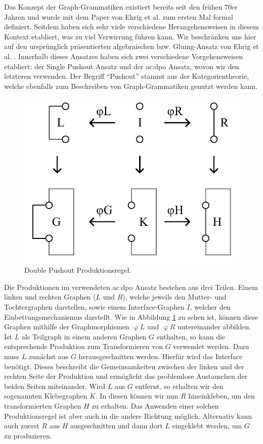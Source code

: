 Das Konzept der Graph-Grammatiken existiert bereits seit den frühen 70er Jahren und wurde mit dem Paper von Ehrig et al. \cite{7_ehrig_et_al}
zum ersten Mal formal definiert. Seitdem haben sich sehr viele verschiedene Herangehensweisen in diesem Kontext etabliert, was zu viel Verwirrung
führen kann. \cite{30_könig_et_al} Wir beschränken uns hier auf den ursprünglich präsentierten algebraischen bzw. Gluing-Ansatz von Ehrig 
et al. \cite{7_ehrig_et_al}. Innerhalb dieses Ansatzes haben sich zwei verschiedene Vorgehensweisen etabliert: der Single Pushout Ansatz und der
\gls{ac:dpo} Ansatz, wovon wir den letzteren verwenden. Der Begriff ``Pushout'' stammt aus der Kategorientheorie, welche ebenfalls zum Beschreiben
von Graph-Grammatiken genutzt werden kann. \cite{1_merrell}

\begin{figure}[t]
    \centering
    \includegraphics[width=\imgWidth/2]{images/dpo_rule.pdf}
    \caption{Double Pushout Produktionsregel.}
    \label{fig:dpo_rule}
\end{figure}

Die Produktionen im verwendeten \gls{ac:dpo} Ansatz bestehen aus drei Teilen. Einem linken und rechten Graphen (\(L\) und \(R\)), welche jeweils
den Mutter- und Tochtergraphen darstellen, sowie einem Interface-Graphen \(I\), welcher den Einbettungsmechanismus darstellt. Wie in Abbildung
\ref{fig:dpo_rule} zu sehen ist, können diese Graphen mithilfe der Graphmorphismen \(\upvarphi L\) und \(\upvarphi R\) untereinander abbilden.
Ist \(L\) als Teilgraph in einem anderen Graphen \(G\) enthalten, so kann die entsprechende Produktion zum Transformieren von \(G\) verwendet werden.
Dazu muss \(L\) zunächst aus \(G\) herausgeschnitten werden. Hierfür wird das Interface benötigt. Dieses beschreibt die Gemeinsamkeiten zwischen
der linken und der rechten Seite der Produktion und ermöglicht das problemlose Austauschen der beiden Seiten miteinander. Wird \(L\) aus \(G\)
entfernt, so erhalten wir den sogenannten Klebegraphen \(K\). In diesen können wir nun \(R\) hineinkleben, um den transformierten Graphen \(H\)
zu erhalten. Das Anwenden einer solchen Produktionsregel ist aber auch in die andere Richtung möglich. Alternativ kann auch zuerst \(R\) aus
\(H\) ausgeschnitten und dann dort \(L\) eingeklebt werden, um \(G\) zu produzieren. \cite{7_ehrig_et_al}

